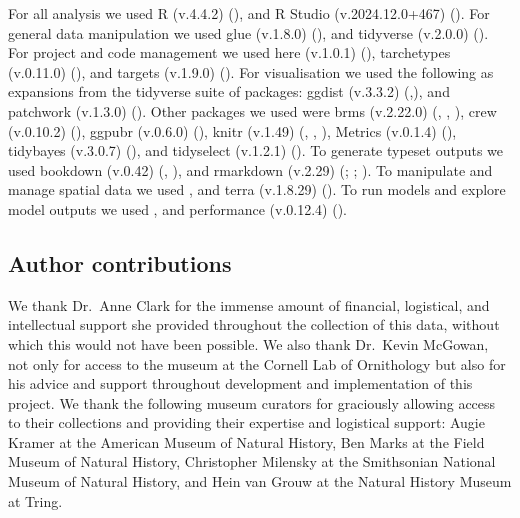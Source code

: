 \documentclass[10pt,a4paper]{article}
\begin{document}
For all analysis we used R (v.4.4.2) (), and R Studio (v.2024.12.0+467) (). For general data manipulation we used glue (v.1.8.0) (), and tidyverse (v.2.0.0) (). For project and code management we used here (v.1.0.1) (), tarchetypes (v.0.11.0) (), and targets (v.1.9.0) (). For visualisation we used the following as expansions from the tidyverse suite of packages: ggdist (v.3.3.2) (,), and patchwork (v.1.3.0) (). Other packages we used were brms (v.2.22.0) (, , ), crew (v.0.10.2) (), ggpubr (v.0.6.0) (), knitr (v.1.49) (, , ), Metrics (v.0.1.4) (), tidybayes (v.3.0.7) (), and tidyselect (v.1.2.1) (). To generate typeset outputs we used bookdown (v.0.42) (, ), and rmarkdown (v.2.29) (; ; ). To manipulate and manage spatial data we used , and terra (v.1.8.29) (). To run models and explore model outputs we used , and performance (v.0.12.4) ().

\subsection{Author contributions}\label{author-contributions}

We thank Dr.~Anne Clark for the immense amount of financial, logistical, and intellectual support she provided throughout the collection of this data, without which this would not have been possible.
We also thank Dr.~Kevin McGowan, not only for access to the museum at the Cornell Lab of Ornithology but also for his advice and support throughout development and implementation of this project.
We thank the following museum curators for graciously allowing access to their collections and providing their expertise and logistical support: Augie Kramer at the American Museum of Natural History, Ben Marks at the Field Museum of Natural History, Christopher Milensky at the Smithsonian National Museum of Natural History, and Hein van Grouw at the Natural History Museum at Tring.
\end{document}
